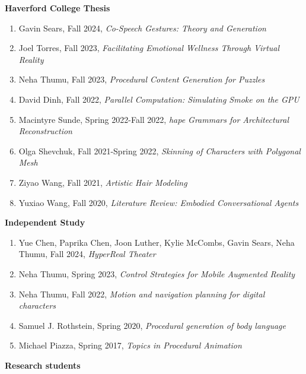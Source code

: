 {\bf Haverford College Thesis}
\vspace{-1.0em}

\begin{enumerate}[leftmargin=*,label={}]
  \item Gavin Sears, Fall 2024, \textit{Co-Speech Gestures: Theory and Generation}
  \item Joel Torres, Fall 2023, \textit{Facilitating Emotional Wellness Through Virtual Reality}
  \item Neha Thumu, Fall 2023, \textit{Procedural Content Generation for Puzzles}
  \item David Dinh, Fall 2022, \textit{Parallel Computation: Simulating Smoke on the GPU}
  \item Macintyre Sunde, Spring 2022-Fall 2022, \textit{hape Grammars for Architectural Reconstruction}
  \item Olga Shevchuk, Fall 2021-Spring 2022, \textit{Skinning of Characters with Polygonal Mesh}
  \item Ziyao Wang, Fall 2021, \textit{Artistic Hair Modeling}
  \item Yuxiao Wang, Fall 2020, \textit{Literature Review: Embodied Conversational Agents}
\end{enumerate}

{\bf Independent Study}
\vspace{-1.0em}

\begin{enumerate}[leftmargin=*,label={}]
  \item Yue Chen, Paprika Chen, Joon Luther, Kylie McCombs, Gavin Sears, Neha Thumu, Fall 2024, \textit{HyperReal Theater}
  \item Neha Thumu, Spring 2023, \textit{Control Strategies for Mobile Augmented Reality}
  \item Neha Thumu, Fall 2022, \textit{Motion and navigation planning for digital characters}
  \item Samuel J. Rothstein, Spring 2020, \textit{Procedural generation of body language}
  \item Michael Piazza, Spring 2017, \textit{Topics in Procedural Animation}
\end{enumerate}

{\bf Research students} 
\vspace{-1.0em}


